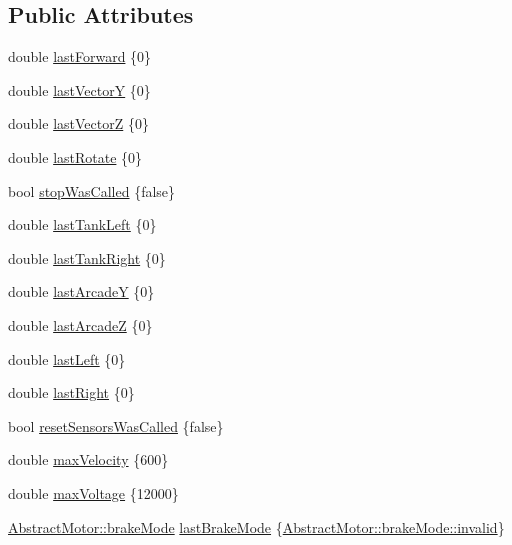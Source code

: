\subsection*{Public Attributes}
\begin{DoxyCompactItemize}
\item 
double \mbox{\hyperlink{classokapi_1_1MockChassisModel_a4f469a4c1aa7c6d42bb9f86e3ca07e73}{last\+Forward}} \{0\}
\item 
double \mbox{\hyperlink{classokapi_1_1MockChassisModel_af595e6f84e5b26d711745208e45c6552}{last\+VectorY}} \{0\}
\item 
double \mbox{\hyperlink{classokapi_1_1MockChassisModel_ac6ec55cc58d8de698293264845f79ef8}{last\+VectorZ}} \{0\}
\item 
double \mbox{\hyperlink{classokapi_1_1MockChassisModel_a6d57ea66c20cada58ed06e3e1a7a2c53}{last\+Rotate}} \{0\}
\item 
bool \mbox{\hyperlink{classokapi_1_1MockChassisModel_a4a2b510bce0be6c0b3b75e3954da7dcb}{stop\+Was\+Called}} \{false\}
\item 
double \mbox{\hyperlink{classokapi_1_1MockChassisModel_a09dafc49816f2db00d14becaf540497c}{last\+Tank\+Left}} \{0\}
\item 
double \mbox{\hyperlink{classokapi_1_1MockChassisModel_a792c4d920aae96b255499aaef275dba1}{last\+Tank\+Right}} \{0\}
\item 
double \mbox{\hyperlink{classokapi_1_1MockChassisModel_aea7d0aa26d03376af5e67c92f458bd86}{last\+ArcadeY}} \{0\}
\item 
double \mbox{\hyperlink{classokapi_1_1MockChassisModel_a5d92d43fb202fbb3a1b47ea4095d10d9}{last\+ArcadeZ}} \{0\}
\item 
double \mbox{\hyperlink{classokapi_1_1MockChassisModel_abed279a27c9673f52b046d8a69420d13}{last\+Left}} \{0\}
\item 
double \mbox{\hyperlink{classokapi_1_1MockChassisModel_ac97b57b65e30fb525830a622e366f841}{last\+Right}} \{0\}
\item 
bool \mbox{\hyperlink{classokapi_1_1MockChassisModel_ad0225b2ed9901d8d6abf8daa4320bf07}{reset\+Sensors\+Was\+Called}} \{false\}
\item 
double \mbox{\hyperlink{classokapi_1_1MockChassisModel_a085bf6c5e397a74792fd18b2e62ab125}{max\+Velocity}} \{600\}
\item 
double \mbox{\hyperlink{classokapi_1_1MockChassisModel_a138ea75fbc58814e75635a34e5ba1ab8}{max\+Voltage}} \{12000\}
\item 
\mbox{\hyperlink{classokapi_1_1AbstractMotor_a132e0485dbb59a60c3f934338d8fa601}{Abstract\+Motor\+::brake\+Mode}} \mbox{\hyperlink{classokapi_1_1MockChassisModel_a70ac111f1eab1281c86f3c8f865a835c}{last\+Brake\+Mode}} \{\mbox{\hyperlink{classokapi_1_1AbstractMotor_a132e0485dbb59a60c3f934338d8fa601afedb2d84cafe20862cb4399751a8a7e3}{Abstract\+Motor\+::brake\+Mode\+::invalid}}\}

\end{DoxyCompactItemize}
